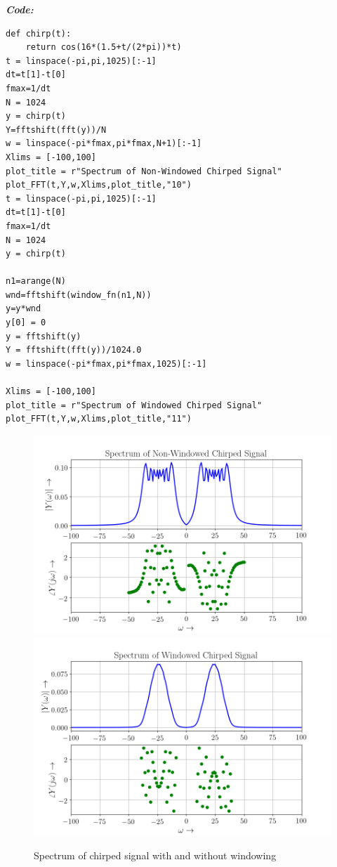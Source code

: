 \documentclass[11pt, a4paper]{article}
\begin{document}
\textit{\textbf{Code:}}
\begin{lstlisting}
def chirp(t):
    return cos(16*(1.5+t/(2*pi))*t)
t = linspace(-pi,pi,1025)[:-1]
dt=t[1]-t[0]
fmax=1/dt
N = 1024
y = chirp(t)
Y=fftshift(fft(y))/N
w = linspace(-pi*fmax,pi*fmax,N+1)[:-1]       
Xlims = [-100,100]
plot_title = r"Spectrum of Non-Windowed Chirped Signal"
plot_FFT(t,Y,w,Xlims,plot_title,"10")
t = linspace(-pi,pi,1025)[:-1]
dt=t[1]-t[0]
fmax=1/dt
N = 1024
y = chirp(t)

n1=arange(N)
wnd=fftshift(window_fn(n1,N))
y=y*wnd
y[0] = 0
y = fftshift(y)
Y = fftshift(fft(y))/1024.0
w = linspace(-pi*fmax,pi*fmax,1025)[:-1]       

Xlims = [-100,100]
plot_title = r"Spectrum of Windowed Chirped Signal"
plot_FFT(t,Y,w,Xlims,plot_title,"11")

\end{lstlisting}
\newpage
\begin{figure}[!tbh]
  \centering
  \includegraphics[scale=0.6]{./../Extras/fig10-10.png}  %
  \includegraphics[scale=0.6]{./../Extras/fig10-11.png}  %
  \caption{Spectrum of chirped signal with and without windowing}
\end{figure}
\newpage
\end{document}
